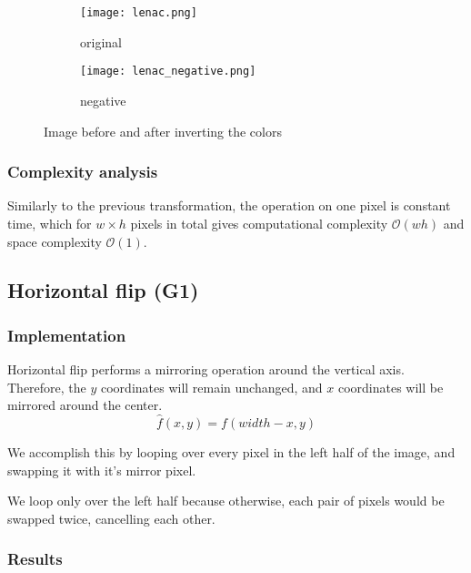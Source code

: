 \documentclass[12pt]{article}
\begin{document}
\begin{figure}[H]\centering
    \begin{subfigure}[t]{\subfiguresize}\centering
        \texttt{[image: lenac.png]}
        \caption{original}
    \end{subfigure}
    \hspace{.05\textwidth}
    \begin{subfigure}[t]{\subfiguresize}\centering
        \texttt{[image: lenac\_negative.png]}
        \caption{negative}
    \end{subfigure}
    \caption{Image before and after inverting the colors}
\end{figure}

\subsubsection{Complexity analysis}

Similarly to the previous transformation,
the operation on one pixel is constant time, which for $w \times h$ pixels in total gives computational complexity $\mathcal{O}(wh)$
and space complexity $\mathcal{O}(1)$.

\vspace{5em}
\pagebreak[3]
\subsection{Horizontal flip (G1)}

\subsubsection{Implementation}

Horizontal flip performs a mirroring operation around the vertical axis.
Therefore, the $y$ coordinates will remain unchanged, and $x$ coordinates will be mirrored around the center.
\begin{equation}
    \hat{f}(x,y) = f(width - x, y)
\end{equation}

We accomplish this by looping over every pixel in the left half of the image,
and swapping it with it's mirror pixel.

We loop only over the left half
because otherwise, each pair of pixels would be swapped twice,
cancelling each other.

\subsubsection{Results}
\end{document}
